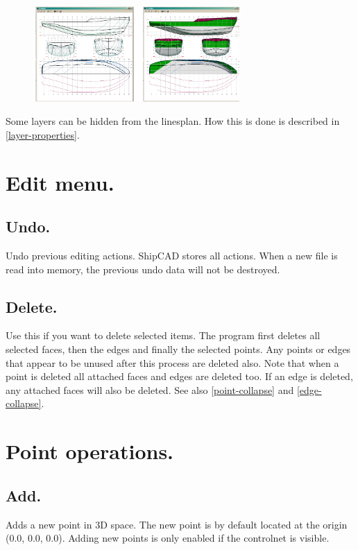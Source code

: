 \documentclass[12pt]{article}
\begin{document}
\begin{figure}
        \centering
        \includegraphics[width=0.7\textwidth,natwidth=867,natheight=405]{linesplan.png}
        \caption{}
        \label{fig:linesplan}
\end{figure}

Some layers can be hidden from the linesplan. How this is done is
described in
\ref{layer-properties}.

\pagebreak

\section{Edit menu.}

\subsection{Undo.}
Undo previous editing actions. ShipCAD stores all actions. When a new
file is read into memory, the previous undo data will not be
destroyed.

\subsection{Delete.}
Use this if you want to delete selected items. The program first
deletes all selected faces, then the edges and finally the selected
points. Any points or edges that appear to be unused after this
process are deleted also. Note that when a point is deleted all
attached faces and edges are deleted too. If an edge is deleted, any
attached faces will also be deleted. See also \ref{point-collapse}
and \ref{edge-collapse}.

\pagebreak

\section{Point operations.}

\subsection{Add.}
Adds a new point in 3D space. The new point is by default located at
the origin (0.0, 0.0, 0.0).  Adding new points is only enabled if the
controlnet is visible.
\end{document}
